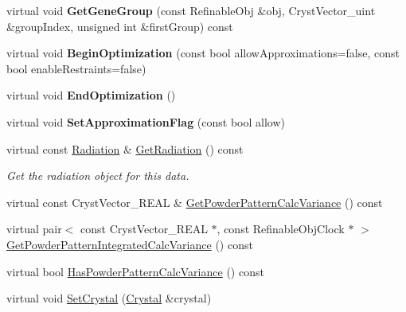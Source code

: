 \begin{DoxyCompactItemize}
virtual void {\bfseries Get\+Gene\+Group} (const Refinable\+Obj \&obj, Cryst\+Vector\+\_\+uint \&group\+Index, unsigned int \&first\+Group) const
\item 
\mbox{\label{class_obj_cryst_1_1_powder_pattern_diffraction_aeeab859828c66a4d5a054c4db4546c8a}} 
virtual void {\bfseries Begin\+Optimization} (const bool allow\+Approximations=false, const bool enable\+Restraints=false)
\item 
\mbox{\label{class_obj_cryst_1_1_powder_pattern_diffraction_ab20de447ee5e2a3e4e16ef5f963340c4}} 
virtual void {\bfseries End\+Optimization} ()
\item 
\mbox{\label{class_obj_cryst_1_1_powder_pattern_diffraction_ae12b37beec1ead88a2aa74cf5a690eff}} 
virtual void {\bfseries Set\+Approximation\+Flag} (const bool allow)
\item 
\mbox{\label{class_obj_cryst_1_1_powder_pattern_diffraction_ae8f77de4dc672436439afffd570e74ca}} 
virtual const \mbox{\hyperlink{class_obj_cryst_1_1_radiation}{Radiation}} \& \mbox{\hyperlink{class_obj_cryst_1_1_powder_pattern_diffraction_ae8f77de4dc672436439afffd570e74ca}{Get\+Radiation}} () const
\begin{DoxyCompactList}\small\item\em Get the radiation object for this data. \end{DoxyCompactList}\item 
virtual const Cryst\+Vector\+\_\+\+R\+E\+AL \& \mbox{\hyperlink{class_obj_cryst_1_1_powder_pattern_diffraction_a779d369f39ab01390caf28eb539bfc9e}{Get\+Powder\+Pattern\+Calc\+Variance}} () const
\item 
virtual pair$<$ const Cryst\+Vector\+\_\+\+R\+E\+AL $\ast$, const Refinable\+Obj\+Clock $\ast$ $>$ \mbox{\hyperlink{class_obj_cryst_1_1_powder_pattern_diffraction_a0af11c8ffb08972bcc13b71fd531071a}{Get\+Powder\+Pattern\+Integrated\+Calc\+Variance}} () const
\item 
virtual bool \mbox{\hyperlink{class_obj_cryst_1_1_powder_pattern_diffraction_a70c5f1b70bbe4ace8ee26120d5f85fd1}{Has\+Powder\+Pattern\+Calc\+Variance}} () const
\item 
virtual void \mbox{\hyperlink{class_obj_cryst_1_1_powder_pattern_diffraction_a5e32e21896fdd947add0cc47fad0bc87}{Set\+Crystal}} (\mbox{\hyperlink{class_obj_cryst_1_1_crystal}{Crystal}} \&crystal)

\end{DoxyCompactItemize}
